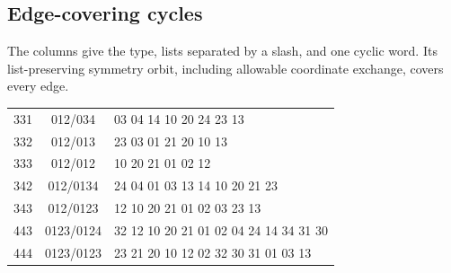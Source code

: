 \documentclass[11pt]{article}
\numberwithin{equation}{section}
\numberwithin{table}{section}
\begin{document}
\subsection{Edge-covering cycles}
The columns give the type, lists separated by a slash, and one cyclic
word. Its list-preserving symmetry orbit, including allowable coordinate
exchange, covers every edge.
\begin{center}\small\ttfamily
\begin{tabular}{ccl}
331 & 012/034 & 03 04 14 10 20 24 23 13\\
332 & 012/013 & 23 03 01 21 20 10 13\\
333 & 012/012 & 10 20 21 01 02 12\\
342 & 012/0134 & 24 04 01 03 13 14 10 20 21 23\\
343 & 012/0123 & 12 10 20 21 01 02 03 23 13\\
443 & 0123/0124 & 32 12 10 20 21 01 02 04 24 14 34 31 30\\
444 & 0123/0123 & 23 21 20 10 12 02 32 30 31 01 03 13
\end{tabular}
\end{center}

\end{document}
